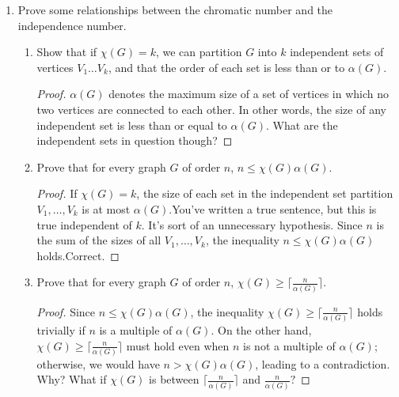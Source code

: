 \documentclass[11pt]{article}
\begin{document}
\begin{enumerate}[leftmargin=*]
\begin{enumerate}[label=\alph*.]
    \begin{enumerate}
        \item $\chi(G)$
        \item $\alpha(G)$
        \item $\omega(G)$
        \item $\theta(G)$
        \item \color{red}Solution. $\text{dom}(G)$\color{black}
    \end{enumerate}
    \begin{proof}
        We want everyone to hate everyone so we take the vertices that either all hate each other or is connected to everyone else, so they hate everyone else.\color{red}Not quite; I think you'd want to invite a clique of people.\color{black}
    \end{proof}
\end{enumerate}
\item Prove some relationships between the chromatic number and the independence number. 
\begin{enumerate}[label=\alph*.]
    \item Show that if $\chi(G)=k$, we can partition $G$ into $k$ independent sets of vertices $V_1\dots V_k$, and that the order of each set is less than or  to $\alpha(G)$.
    \begin{proof}
        $\alpha(G)$ denotes the maximum size of a set of vertices in which no two vertices are connected to each other. In other words, the size of any independent set is less than or equal to $\alpha(G)$. \color{red}What are the independent sets in question though?\color{black}
    \end{proof}
    \item Prove that for every graph $G$ of order $n$, $n \leq \chi(G)\alpha(G)$.
    \begin{proof}
        If $\chi(G)=k$, the size of each set in the independent set partition $V_1, \dots, V_k$ is at most $\alpha(G)$.\color{red}You've written a true sentence, but this is true independent of $k.$ It's sort of an unnecessary hypothesis.\color{black} Since $n$ is the sum of the sizes of all $V_1, \dots, V_k$, the inequality $n \le \chi(G)\alpha(G)$ holds.\color{red}Correct.\color{black}
    \end{proof}
    \item Prove that for every graph $G$ of order $n$, $\chi(G) \geq \lceil\frac{n}{\alpha(G)} \rceil$.
    \begin{proof}
        Since $n \le \chi(G)\alpha(G)$, the inequality $\chi(G) \ge \lceil \frac{n}{\alpha(G)} \rceil$ holds trivially if $n$ is a multiple of $\alpha(G)$. On the other hand, $\chi(G) \ge \lceil \frac{n}{\alpha(G)} \rceil$ must hold even when $n$ is not a multiple of $\alpha(G)$; otherwise, we would have $n > \chi(G)\alpha(G)$, leading to a contradiction. \color{red}Why? What if $\chi(G)$ is between $\lceil\frac{n}{\alpha(G)}\rceil$ and $\frac{n}{\alpha(G)}?$\color{black}

\end{proof}
\end{enumerate}
\end{enumerate}
\end{document}
